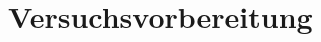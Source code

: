 \documentclass[usenames,dvipsnames]{include/protokollclass}
\begin{document}
    \chapter{Versuchsvorbereitung} 
    
   
    \Appendix
    \chapter*{\appendixname} 

	\begingroup
	\let\clearpage\relax

    \TheBibliography

    
    

    \endgroup
\end{document}

